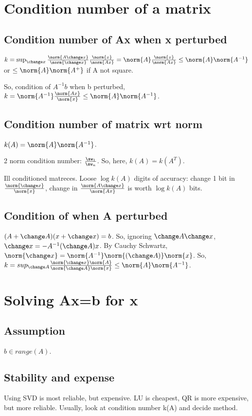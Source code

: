 \documentclass[oneside, article]{memoir}
\begin{document}
\chapter{Condition number of a matrix}
\section{Condition number of Ax when x perturbed}
$k = \sup_{\change x} \frac{\norm{A\change x}}{\norm{\change x}}\frac{\norm{x}}{\norm{Ax}} = \norm{A}\frac{\norm{x}}{\norm{Ax}} \leq \norm{A}\norm{A^{-1}}$ or $\leq \norm{A}\norm{A^{+}}$ if A not square.

So, condition of $A^{-1}b$ when b perturbed, $k = \norm{A^{-1}}\frac{\norm{Ax}}{\norm{x}} \leq \norm{A}\norm{A^{-1}}$.

\section{Condition number of matrix wrt norm}
$k(A) = \norm{A}\norm{A^{-1}}$.

2 norm condition number: $\frac{\sw_{1}}{\sw_{n}}$. So, here, $k(A) = k(A^{T})$.

Ill conditioned matreces. Loose $\log k(A)$ digits of accuracy: change 1 bit in $\frac{\norm{\change x}}{\norm{x}}$, change in $\frac{\norm{A\change x}}{\norm{Ax}}$ is worth $\log k(A)$ bits.

\section{Condition of  when A perturbed}
$(A+\change A)(x+\change x) = b$. So, ignoring $\change A \change x$, $\change x = -A^{-1}(\change A)x$. By Cauchy Schwartz, $\norm{\change x} = \norm{A^{-1}}\norm{(\change A)}\norm{x}$. So, $k = sup_{\change A}\frac{\norm{\change x }\norm{A}}{\norm{\change A}\norm{x}} \leq \norm{A}\norm{A^{-1}}$.



\chapter{Solving Ax=b for x}
\section{Assumption}
$b \in range(A)$.

\section{Stability and expense}
Using SVD is most reliable, but expensive. LU is cheapest, QR is more expensive, but more reliable. Usually, look at condition number k(A) and decide method.
\end{document}
